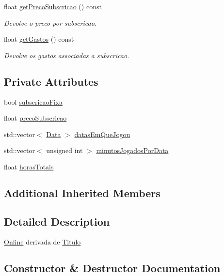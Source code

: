 \begin{DoxyCompactItemize}
float \mbox{\hyperlink{class_online_a0f7240aa5582e10579d0719e4fa5d705}{get\+Preco\+Subscricao}} () const
\begin{DoxyCompactList}\small\item\em Devolve o preco por subscricao. \end{DoxyCompactList}\item 
float \mbox{\hyperlink{class_online_ac3a2197523ee26effcacd9a2a9fe968e}{get\+Gastos}} () const
\begin{DoxyCompactList}\small\item\em Devolve os gastos associadas a subscricao. \end{DoxyCompactList}\end{DoxyCompactItemize}
\subsection*{Private Attributes}
\begin{DoxyCompactItemize}
\item 
bool \mbox{\hyperlink{class_online_ada57c60b1e5fb9ce52ddd404d8fba0d8}{subscricao\+Fixa}}
\item 
float \mbox{\hyperlink{class_online_abdda45fac82bee0662c0ef17807615bb}{preco\+Subscricao}}
\item 
std\+::vector$<$ \mbox{\hyperlink{class_data}{Data}} $>$ \mbox{\hyperlink{class_online_af09568a546c6c56fe02e9ce7e79932db}{datas\+Em\+Que\+Jogou}}
\item 
std\+::vector$<$ unsigned int $>$ \mbox{\hyperlink{class_online_a89730f15205eaa6025c6f5ac35d54158}{minutos\+Jogados\+Por\+Data}}
\item 
float \mbox{\hyperlink{class_online_ade9f15ffcf5486ce321ce48d40da2520}{horas\+Totais}}
\end{DoxyCompactItemize}
\subsection*{Additional Inherited Members}


\subsection{Detailed Description}
\mbox{\hyperlink{class_online}{Online}} derivada de \mbox{\hyperlink{class_titulo}{Titulo}} 

\subsection{Constructor \& Destructor Documentation}
\mbox{\label{class_online_ae6a934ef34ed86ab205190f2b632366a}} 
